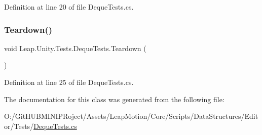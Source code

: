 Definition at line 20 of file Deque\+Tests.\+cs.

\mbox{\label{class_leap_1_1_unity_1_1_tests_1_1_deque_tests_a341ea1a3c0670c343a608938a45892c0}} 
\subsubsection{\texorpdfstring{Teardown()}{Teardown()}}
{\footnotesize\ttfamily void Leap.\+Unity.\+Tests.\+Deque\+Tests.\+Teardown (\begin{DoxyParamCaption}{ }\end{DoxyParamCaption})}



Definition at line 25 of file Deque\+Tests.\+cs.



The documentation for this class was generated from the following file\+:\begin{DoxyCompactItemize}
\item 
O\+:/\+Git\+H\+U\+B\+M\+I\+N\+I\+P\+Roject/\+Assets/\+Leap\+Motion/\+Core/\+Scripts/\+Data\+Structures/\+Editor/\+Tests/\mbox{\hyperlink{_deque_tests_8cs}{Deque\+Tests.\+cs}}\end{DoxyCompactItemize}
